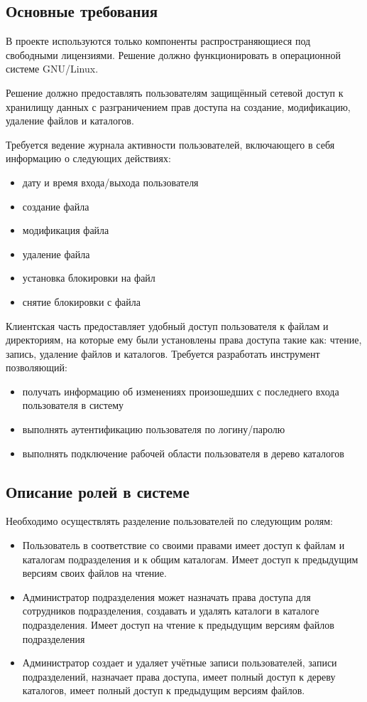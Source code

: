 \documentclass[utf8,usehyperref,12pt]{G7-32}
\begin{document}
\subsection{Основные требования}
В проекте используются только компоненты распространяющиеся под свободными лицензиями. 
Решение должно функционировать в операционной системе GNU/Linux.

Решение должно предоставлять пользователям защищённый сетевой доступ к 
хранилищу данных с разграничением прав доступа на создание, модификацию, удаление 
файлов и каталогов.

Требуется ведение журнала активности пользователей, включающего в себя информацию о следующих действиях: 

\begin{itemize}
\item дату и время входа/выхода пользователя
\item создание файла
\item модификация файла
\item удаление файла
\item установка блокировки на файл
\item снятие блокировки с файла
\end{itemize}

Клиентская часть предоставляет удобный доступ пользователя к файлам и директориям, на которые ему были 
установлены права доступа такие как: чтение, запись, удаление файлов и каталогов.
Требуется разработать инструмент позволяющий:

\begin{itemize}
\item получать информацию об изменениях произошедших с последнего входа пользователя в систему	
\item выполнять аутентификацию пользователя по логину/паролю	
\item выполнять подключение рабочей области пользователя в дерево каталогов
\end{itemize}

\subsection{Описание ролей в системе}

Необходимо осуществлять разделение пользователей по следующим ролям:
\begin{itemize}
\item Пользователь в соответствие со своими правами имеет доступ к 
файлам и каталогам подразделения и к общим каталогам. Имеет доступ к 
предыдущим версиям своих файлов на чтение. 
\item Администратор подразделения может назначать права доступа для сотрудников 
подразделения, создавать и удалять каталоги в каталоге подразделения. 
Имеет доступ на чтение к предыдущим версиям файлов подразделения	
\item Администратор создает и удаляет учётные записи пользователей, 
записи подразделений, назначает права доступа, имеет полный
доступ к дереву каталогов, имеет полный доступ к предыдущим версиям файлов.
\end{itemize}
\end{document}
